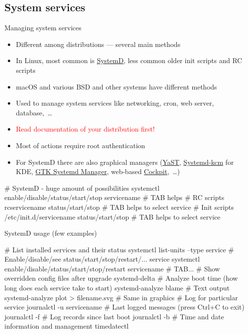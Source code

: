 \documentclass[compress, xelatex, 11pt, xcolor=svgnames, aspectratio=169,
	hyperref={
		bookmarks=true,
		unicode=true,
		colorlinks=true,
		pdftitle={Linux, command line and MetaCentrum},
		plainpages=false,
		pdfauthor={Vojtech Zeisek},
		pdfsubject={Course about use of Linux command line, writing shell scripts and using MetaCentrum of CESNET},
		pdfcreator={XeLaTeX},
		pdfkeywords={Linux, GNU, BASH, shell, command line, MetaCentrum},
		linkcolor=DarkRed, %
		anchorcolor=DarkBlue, %
		citecolor=Indigo, %
		filecolor=NavyBlue, %
		menucolor=DarkMagenta, %
		urlcolor=DarkBlue, %
		},
	url={hyphens, lowtilde} %
	]{beamer}
\renewcommand{\alert}[1]{\textcolor{red}{#1}}
\begin{document}
\subsection{System services} %

\begin{frame}[fragile]{Managing system services}
	\begin{itemize}
		\item Different among distributions --- several main methods
		\item In Linux, most common is \href{https://wiki.freedesktop.org/www/Software/systemd/}{SystemD}, less common older init scripts and RC scripts
		\item macOS and various BSD and other systems have different methods
		\item Used to manage system services like networking, cron, web server, database,~\ldots
		\item \alert{Read documentation of your distribution first!}
		\item Most of actions require root authentication
		\item For SystemD there are also graphical managers (\href{https://doc.opensuse.org/documentation/leap/reference/html/book-reference/cha-systemd.html#sec-boot-runlevel-edit}{YaST}, \href{https://store.kde.org/p/1127873/}{Systemd-kcm} for KDE, \href{https://github.com/GuillaumeGomez/systemd-manager}{GTK Systemd Manager}, web-based \href{https://cockpit-project.org/}{Cockpit},~\ldots)
	\end{itemize}
	\vfill
	\begin{bashcode}
    # SystemD - huge amount of possibilities
    systemctl enable/disable/status/start/stop servicename # TAB helps
    # RC scripts
    rcservicename status/start/stop # TAB helps to select service
    # Init scripts
    /etc/init.d/servicename status/start/stop # TAB helps to select service
	\end{bashcode}
\end{frame}

\begin{frame}[fragile]{SystemD usage (few examples)}
	\begin{bashcode}
    # List installed services and their status
    systemctl list-units --type service
    # Enable/disable/see status/start/stop/restart/... service
    systemctl enable/disable/status/start/stop/restart servicename # TAB...
    # Show overridden config files after upgrade
    systemd-delta
    # Analyze boot time (how long does each service take to start)
    systemd-analyze blame # Text output
    systemd-analyze plot > filename.svg # Same in graphics
    # Log for particular service
    journalctl -u servicename
    # Last logged messages (press Ctrl+C to exit)
    journalctl -f
    # Log records since last boot
    journalctl -b
    # Time and date information and management
    timedatectl
	\end{bashcode}
\end{frame}
\end{document}
